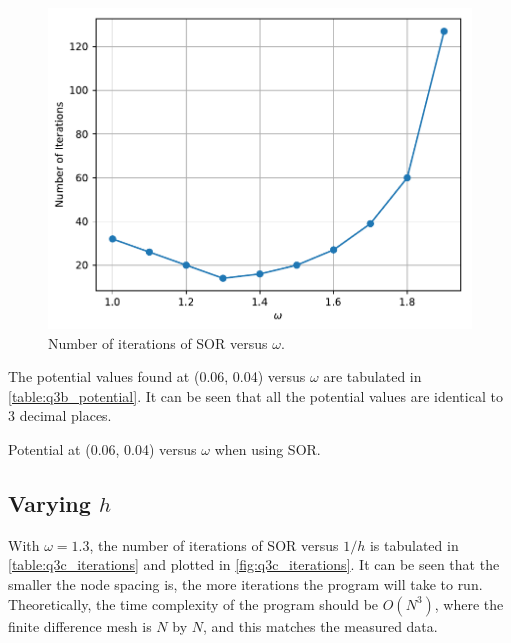 \documentclass[a4paper,titlepage]{article}
\begin{document}
	\begin{figure}[!htb]
		\centering
		\includegraphics[width=\columnwidth]{plots/q3b.pdf}
		\caption
		{Number of iterations of SOR versus $\omega$.}
		\label{fig:q3b}
	\end{figure}

	The potential values found at (0.06, 0.04) versus $\omega$ are tabulated in \autoref{table:q3b_potential}. It can be seen that all the potential values are identical to 3 decimal places.

	\begin{table}[!htb]
		\centering
		\caption{Potential at (0.06, 0.04) versus $\omega$ when using SOR.}
		\label{table:q3b_potential}
	\end{table}
	
	\subsection{Varying $h$}
	
	With $\omega = 1.3$, the number of iterations of SOR versus $1/h$ is tabulated in \autoref{table:q3c_iterations} and plotted in \autoref{fig:q3c_iterations}. It can be seen that the smaller the node spacing is, the more iterations the program will take to run. Theoretically, the time complexity of the program should be $O(N^3)$, where the finite difference mesh is $N$ by $N$, and this matches the measured data.
	
\end{document}

